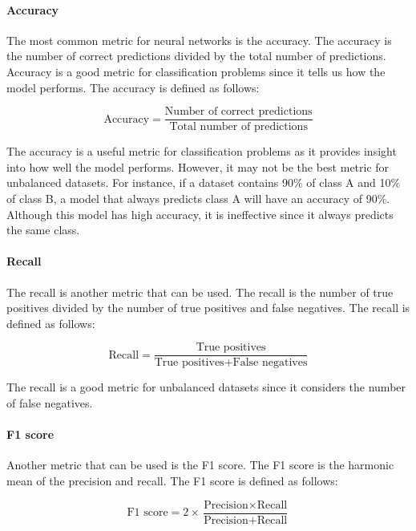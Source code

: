 \paragraph{Accuracy}
The most common metric for neural networks is the accuracy. The accuracy is the number of correct predictions divided by the total number of predictions. Accuracy is a good metric for classification problems since it tells us how the model performs. The accuracy is defined as follows:

\begin{equation}
    \text{Accuracy} = \frac{\text{Number of correct predictions}}{\text{Total number of predictions}}
\end{equation}

The accuracy is a useful metric for classification problems as it provides insight into how well the model performs. However, it may not be the best metric for unbalanced datasets. For instance, if a dataset contains 90\% of class A and 10\% of class B, a model that always predicts class A will have an accuracy of 90\%. Although this model has high accuracy, it is ineffective since it always predicts the same class.

\paragraph{Recall}
The recall is another metric that can be used. The recall is the number of true positives divided by the number of true positives and false negatives. The recall is defined as follows:

\begin{equation}
    \text{Recall} = \frac{\text{True positives}}{\text{True positives} + \text{False negatives}}
\end{equation}

The recall is a good metric for unbalanced datasets since it considers the number of false negatives.

\paragraph*{F1 score}
Another metric that can be used is the F1 score. The F1 score is the harmonic mean of the precision and recall. The F1 score is defined as follows:

\begin{equation}
    \text{F1 score} = 2 \times \frac{\text{Precision} \times \text{Recall}}{\text{Precision} + \text{Recall}}
\end{equation}

